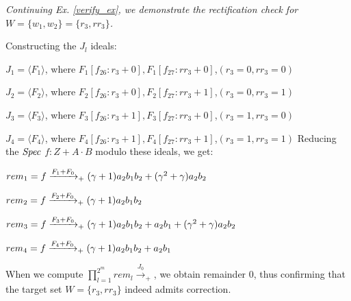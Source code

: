 \begin{Example}
\label{ex:3}
{\it 
Continuing Ex. \ref{verify_ex}, we
demonstrate the rectification check for $W= \{w_1,w_2\} = \{r_3,rr_3\}$. 

Constructing the $J_l$ ideals:
\bi
\item $J_1 = \langle F_1\rangle$, where $F_1[f_{26}: r_3+0],F_1[f_{27}: rr_3 + 0]$,$(r_3 =0, rr_3 = 0)$ 
\item $J_2 = \langle F_2\rangle$, where $F_2[f_{26}: r_3+0],F_2[f_{27}: rr_3 + 1]$,$(r_3 =0, rr_3 = 1)$
\item $J_3 = \langle F_3\rangle$, where $F_3[f_{26}: r_3+1],F_3[f_{27}: rr_3 + 0]$,$(r_3 =1, rr_3 = 0)$
\item $J_4 = \langle F_4\rangle$, where $F_4[f_{26}: r_3+1],F_4[f_{27}: rr_3 + 1]$,$(r_3 =1, rr_3 = 1)$
\ei
Reducing the ${\it Spec}$ $f: Z+A\cdot B$ modulo these ideals, we get:
\bi
\item $rem_1 = f \xrightarrow[]{F_1 + F_{0}}_+(\gamma+1)a_2b_1b_2+(\gamma^2+\gamma)a_2b_2$
\item $rem_2 = f \xrightarrow[]{F_2 + F_{0}}_+(\gamma+1)a_2b_1b_2$
\item $rem_3 = f \xrightarrow[]{F_3 + F_{0}}_+(\gamma+1)a_2b_1b_2+a_2b_1 + (\gamma^2+\gamma)a_2b_2$
\item $rem_4 = f \xrightarrow[]{F_4 + F_{0}}_+(\gamma+1)a_2b_1b_2+a_2b_1$
\ei

When we compute $\prod_{l=1}^{2^m} 
rem_l\xrightarrow{J_{0}}_+$, 
 we obtain remainder 0, thus confirming
that the target set $W=\{r_3,rr_3\}$ indeed admits correction.
}
\end{Example}


